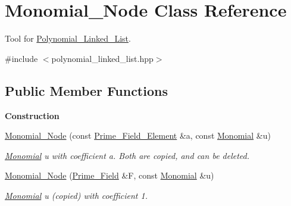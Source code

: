 \hypertarget{class_monomial___node}{}\section{Monomial\+\_\+\+Node Class Reference}
\label{class_monomial___node}


Tool for \hyperlink{class_polynomial___linked___list}{Polynomial\+\_\+\+Linked\+\_\+\+List}.  




{\ttfamily \#include $<$polynomial\+\_\+linked\+\_\+list.\+hpp$>$}

\subsection*{Public Member Functions}
\begin{Indent}\textbf{ Construction}\par
\begin{DoxyCompactItemize}
\item 
\mbox{\label{class_monomial___node_af979446eca6482aa603a53681a0c1ce9}} 
\hyperlink{class_monomial___node_af979446eca6482aa603a53681a0c1ce9}{Monomial\+\_\+\+Node} (const \hyperlink{class_prime___field___element}{Prime\+\_\+\+Field\+\_\+\+Element} \&a, const \hyperlink{class_monomial}{Monomial} \&u)
\begin{DoxyCompactList}\small\item\em \hyperlink{class_monomial}{Monomial} u with coefficient a. Both are copied, and can be deleted. \end{DoxyCompactList}\item 
\mbox{\label{class_monomial___node_a4de7838dc51013c36fe23831249a8096}} 
\hyperlink{class_monomial___node_a4de7838dc51013c36fe23831249a8096}{Monomial\+\_\+\+Node} (\hyperlink{class_prime___field}{Prime\+\_\+\+Field} \&F, const \hyperlink{class_monomial}{Monomial} \&u)
\begin{DoxyCompactList}\small\item\em \hyperlink{class_monomial}{Monomial} u (copied) with coefficient 1. \end{DoxyCompactList}\end{DoxyCompactItemize}
\end{Indent}
